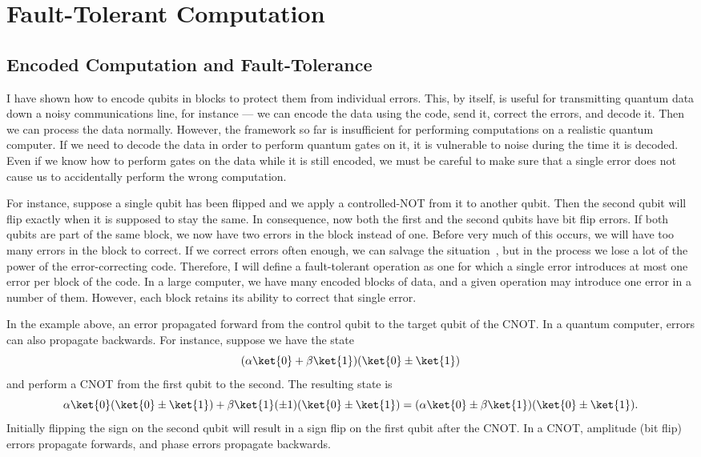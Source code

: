 \chapter{Fault-Tolerant Computation}
\label{chap-fault-tolerant}

\section{Encoded Computation and Fault-Tolerance}

I have shown how to encode qubits in blocks to protect them from
individual errors.  This, by itself, is useful for transmitting quantum data
down a noisy communications line, for instance --- we can encode the data
using the code, send it, correct the errors, and decode it.  Then we can
process the data normally.  However, the framework so far is insufficient
for performing computations on a realistic quantum computer.  If we need
to decode the data in order to perform quantum gates on it, it is vulnerable
to noise during the time it is decoded.  Even if we know how to perform
gates on the data while it is still encoded, we must be careful to make sure
that a single error does not cause us to accidentally perform the wrong
computation.

For instance, suppose a single qubit has been flipped and we apply a
con\-trolled-NOT from it to another qubit.  Then the second qubit will flip
exactly when it is supposed to stay the same.  In consequence, now both
the first and the second qubits have bit flip errors.  If both qubits are part
of the same block, we now have two errors in the block instead of one.
Before very much of this occurs, we will have too many errors in the block
to correct.  If we correct errors often enough, we can salvage the
situation~\cite{aharonov}, but in the process we lose a lot of the power of
the error-correcting code.  Therefore, I will define a fault-tolerant
operation as one for which a single error introduces at most one error per
block of the code.  In a large computer, we have many encoded blocks of
data, and a given operation may introduce one error in a number of them.
However, each block retains its ability to correct that single error.

In the example above, an error propagated forward from the control qubit
to the target qubit of the CNOT.  In a quantum computer, errors can also
propagate backwards.  For instance, suppose we have the state
\begin{equation}
(\alpha \ket{0} + \beta \ket{1}) (\ket{0} \pm \ket{1})
\end{equation}
and perform a CNOT from the first qubit to the second.  The resulting state
is
\begin{equation}
	\alpha \ket{0} (\ket{0} \pm \ket{1}) + \beta \ket{1} (\pm 1) (\ket{0} \pm
	\ket{1}) = (\alpha \ket{0} \pm \beta \ket{1}) (\ket{0} \pm \ket{1}).
\end{equation}
Initially flipping the sign on the second qubit will result in a sign flip on
the first qubit after the CNOT.  In a CNOT, amplitude (bit flip) errors
propagate forwards, and phase errors propagate backwards.


